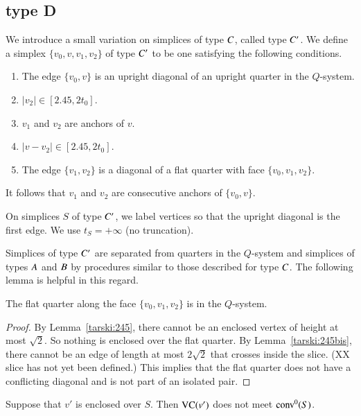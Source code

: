 \subsection{type D}%

We introduce a small variation on simplices of type $C$, called
type $C' $.  We define a simplex $\{v_0,v,v_1,v_2\}$ of type $C' $
to be one satisfying the following conditions.
    \begin{enumerate}
    \item The edge $\{v_0,v\}$ is an upright diagonal of an upright quarter
        in the $Q$-system.
    \item $|v_2|\in[2.45,2t_0]$.
    \item $v_1$ and $v_2$ are anchors of $v$.
    \item $|v-v_2|\in [2.45,2t_0]$.
    \item The edge $\{v_1,v_2\}$
    is a diagonal of a flat quarter with face $\{v_0,v_1,v_2\}$.
    \end{enumerate}

It follows that $v_1$ and $v_2$ are consecutive anchors of
$\{v_0,v\}$.

On simplices $S$ of type $C' $, we label vertices so that the
upright diagonal is the first edge.  We use $t_S=+\infty$ (no
truncation).  

Simplices of type $C' $ are separated from quarters in the
$Q$-system and simplices of types $A$ and $B$ by procedures
similar to those described for type $C$.  The following lemma is
helpful in this regard.


\begin{lemma}\label{lemma:C'Q}
 The flat quarter along the face $\{v_0,v_1,v_2\}$ is
in the $Q$-system.
\end{lemma}

\begin{proof}
By Lemma~\ref{tarski:245}, there cannot be an enclosed vertex
of height at most $\sqrt2$. 
So nothing is enclosed over the flat quarter.
By Lemma~\ref{tarski:245bis}, there cannot be an edge of length
at most $2\sqrt2$ that crosses inside the slice.
(XX slice has not yet been defined.) 
This implies that the flat quarter does not have
a conflicting diagonal and is not part of an isolated pair.
\end{proof}


\begin{lemma}
Suppose that $v'$ is enclosed over $S$.  Then ${\operatorname{VC}}(v')$ does
not meet ${\operatorname{conv}}^0(S)$.
\end{lemma}

